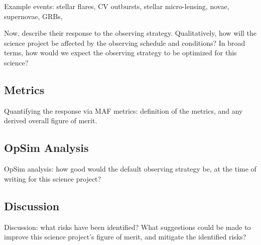 Example events:  stellar flares, CV outbursts, stellar micro-lensing, novae, supernovae, GRBs, 

Now, describe their response to the observing strategy. Qualitatively,
how will the science project be affected by the observing schedule and
conditions? In broad terms, how would we expect the observing strategy
to be optimized for this science?



\subsection{Metrics}
\label{sec:keyword:metrics}

Quantifying the response via MAF metrics: definition of the metrics,
and any derived overall figure of merit.



\subsection{OpSim Analysis}
\label{sec:keyword:analysis}

OpSim analysis: how good would the default observing strategy be, at
the time of writing for this science project?



\subsection{Discussion}
\label{sec:keyword:discussion}

Discussion: what risks have been identified? What suggestions could be
made to improve this science project's figure of merit, and mitigate
the identified risks?




